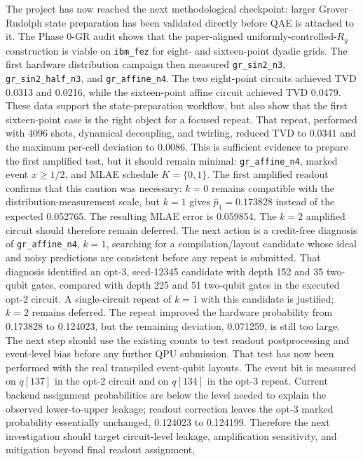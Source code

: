 The project has now reached the next methodological checkpoint: larger
Grover--Rudolph state preparation has been validated directly before QAE is
attached to it. The Phase 0-GR audit shows that the paper-aligned
uniformly-controlled-\(R_y\) construction is viable on \texttt{ibm\_fez} for
eight- and sixteen-point dyadic grids. The first hardware distribution campaign
then measured \texttt{gr\_sin2\_n3}, \texttt{gr\_sin2\_half\_n3}, and
\texttt{gr\_affine\_n4}. The two eight-point circuits achieved TVD 0.0313 and
0.0216, while the sixteen-point affine circuit achieved TVD 0.0479. These data
support the state-preparation workflow, but also show that the first
sixteen-point case is the right object for a focused repeat. That repeat,
performed with 4096 shots, dynamical decoupling, and twirling, reduced TVD to
0.0341 and the maximum per-cell deviation to 0.0086. This is sufficient evidence
to prepare the first amplified test, but it should remain minimal:
\texttt{gr\_affine\_n4}, marked event \(x\ge 1/2\), and MLAE schedule
\(K=\{0,1\}\). The first amplified readout confirms that this caution was
necessary: \(k=0\) remains compatible with the distribution-measurement scale,
but \(k=1\) gives \(\hat p_1=0.173828\) instead of the expected 0.052765. The
resulting MLAE error is 0.059854. The \(k=2\) amplified circuit should therefore
remain deferred. The next action is a credit-free diagnosis of
\texttt{gr\_affine\_n4}, \(k=1\), searching for a compilation/layout candidate
whose ideal and noisy predictions are consistent before any repeat is submitted.
That diagnosis identified an opt-3, seed-12345 candidate with depth 152 and 35
two-qubit gates, compared with depth 225 and 51 two-qubit gates in the executed
opt-2 circuit. A single-circuit repeat of \(k=1\) with this candidate is
justified; \(k=2\) remains deferred. The repeat improved the hardware probability
from 0.173828 to 0.124023, but the remaining deviation, 0.071259, is still too
large. The next step should use the existing counts to test readout
postprocessing and event-level bias before any further QPU submission. That
test has now been performed with the real transpiled event-qubit layouts. The
event bit is measured on \(q[137]\) in the opt-2 circuit and on \(q[134]\) in
the opt-3 repeat. Current backend assignment probabilities are below the level
needed to explain the observed lower-to-upper leakage; readout correction leaves
the opt-3 marked probability essentially unchanged, 0.124023 to 0.124199.
Therefore the next investigation should target circuit-level leakage,
amplification sensitivity, and mitigation beyond final readout assignment,
